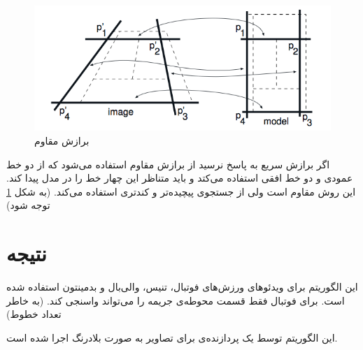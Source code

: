 \documentclass{report}
\begin{document}
\begin{figure}
\centering
\includegraphics[scale=0.5]{robust_fitting.png}
\caption{برازش مقاوم}
\label{robust_fitting}
\end{figure}
اگر برازش سریع به پاسخ نرسید از برازش مقاوم استفاده می‌شود که از دو خط عمودی و دو خط افقی استفاده می‌کتد و باید متناظر این چهار خط را در مدل پیدا کند. این روش مقاوم است ولی از جستجوی پیچیده‌تر و کندتری استفاده می‌کند. (به شکل \ref{robust_fitting} توجه شود)
\section{نتیجه}
این الگوریتم برای ویدئوهای ورزش‌های فوتبال، تنیس، والی‌بال و بدمینتون استفاده شده است. برای فوتبال فقط قسمت محوطه‌ی جریمه را می‌تواند واسنجی کند. (به خاطر تعداد خطوط)

این الگوریتم توسط یک پردازنده‌ی  برای تصاویر  به صورت بلادرنگ اجرا شده است.
\begin{latin}
{}

\end{latin}
\end{document}
